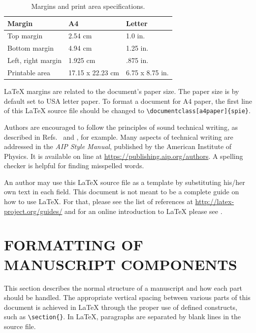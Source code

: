 \documentclass[nocompress]{spie}  %
\begin{document}
\begin{table}[ht]
\caption{Margins and print area specifications.} 
\label{tab:Paper Margins}
\begin{center}       
\begin{tabular}{|l|l|l|} 
\hline
\rule[-1ex]{0pt}{3.5ex}  Margin & A4 & Letter  \\
\hline
\rule[-1ex]{0pt}{3.5ex}  Top margin & 2.54 cm & 1.0 in.   \\
\hline
\rule[-1ex]{0pt}{3.5ex}  Bottom margin & 4.94 cm & 1.25 in.  \\
\hline
\rule[-1ex]{0pt}{3.5ex}  Left, right margin & 1.925 cm & .875 in.  \\
\hline
\rule[-1ex]{0pt}{3.5ex}  Printable area & 17.15 x 22.23 cm & 6.75 x 8.75 in.  \\
\hline 
\end{tabular}
\end{center}
\end{table}

LaTeX margins are related to the document's paper size. The paper size is by default set to USA letter paper. To format a document for A4 paper, the first line of this LaTeX source file should be changed to \verb|\documentclass[a4paper]{spie}|.   

Authors are encouraged to follow the principles of sound technical writing, as described in Refs.~ and , for example.  Many aspects of technical writing are addressed in the {\em AIP Style Manual}, published by the American Institute of Physics.  It is available on line at \url{https://publishing.aip.org/authors}. A spelling checker is helpful for finding misspelled words. 

An author may use this LaTeX source file as a template by substituting his/her own text in each field.  This document is not meant to be a complete guide on how to use LaTeX.  For that, please see the list of references at \url{http://latex-project.org/guides/} and for an online introduction to LaTeX please see . 

\section{FORMATTING OF MANUSCRIPT COMPONENTS}

This section describes the normal structure of a manuscript and how each part should be handled.  The appropriate vertical spacing between various parts of this document is achieved in LaTeX through the proper use of defined constructs, such as \verb|\section{}|.  In LaTeX, paragraphs are separated by blank lines in the source file. 
\end{document}
